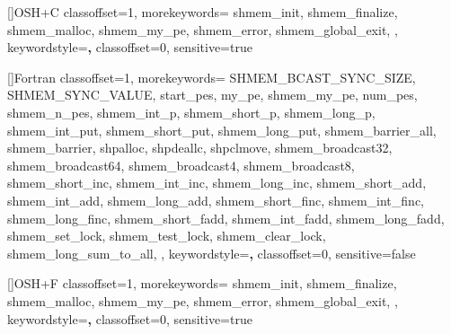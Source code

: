 []{OSH+C}{
  classoffset=1,
  morekeywords={
    shmem_init,
    shmem_finalize,
    shmem_malloc,
    shmem_my_pe,
    shmem_error,
    shmem_global_exit,
  },
  keywordstyle=\color{black}\textbf,
  classoffset=0,
  sensitive=true
}

[]{Fortran}{
  classoffset=1,
  morekeywords={
    SHMEM_BCAST_SYNC_SIZE, SHMEM_SYNC_VALUE,
    start_pes,
    my_pe, shmem_my_pe,
    num_pes, shmem_n_pes,
    shmem_int_p, shmem_short_p, shmem_long_p,
    shmem_int_put, shmem_short_put, shmem_long_put,
    shmem_barrier_all, shmem_barrier,
    shpalloc,  shpdeallc, shpclmove,
    shmem_broadcast32, shmem_broadcast64,
    shmem_broadcast4, shmem_broadcast8,
    shmem_short_inc, shmem_int_inc, shmem_long_inc,
    shmem_short_add, shmem_int_add, shmem_long_add,
    shmem_short_finc, shmem_int_finc, shmem_long_finc,
    shmem_short_fadd, shmem_int_fadd, shmem_long_fadd,
    shmem_set_lock, shmem_test_lock, shmem_clear_lock,
    shmem_long_sum_to_all,
  },
  keywordstyle=\color{black}\textbf,
  classoffset=0,
  sensitive=false
}

[]{OSH+F}{
  classoffset=1,
  morekeywords={
    shmem_init,
    shmem_finalize,
    shmem_malloc,
    shmem_my_pe,
    shmem_error,
    shmem_global_exit,
  },
  keywordstyle=\color{black}\textbf,
  classoffset=0,
  sensitive=true
}

%
%

%
%

\newcommand{\strikeline}[1][red]{{\color{#1}\raisebox{.5ex}{\rule{1em}{.4pt}}}}
\newcommand{\stretchline}[1][red]{\xrfill[.5ex]{.4pt}[#1]}
\newcommand{\DeprecationStart}[1][red]{{\color{#1} deprecation start} \mbox{}}
\newcommand{\DeprecationEnd}[1][red]{{\color{#1} deprecation end} \mbox{}}

\newcommand{\StartDeprecateBlock}{
  {\strikeline\mbox{} \DeprecationStart \stretchline\mbox{}}}
\newcommand{\EndDeprecateBlock}{%
  \mbox{}\stretchline\mbox{} \DeprecationEnd \strikeline}

\newenvironment{DeprecateBlock}{%
  \par \StartDeprecateBlock \par}{\par \EndDeprecateBlock \par}

\newcommand{\StartInlineDeprecate}{%
  \strikeline\mbox{} \DeprecationStart \strikeline \mbox{}}
\newcommand{\EndInlineDeprecate}{%
  \strikeline\mbox{} \DeprecationEnd \strikeline}
\newenvironment{DeprecateInline}{\StartInlineDeprecate}{\EndInlineDeprecate}

